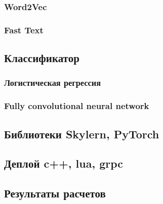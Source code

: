 \documentclass[12pt]{article}
\begin{document}
\subsubsection*{Word2Vec}

\subsubsection*{Fast Text}

\subsection*{Классификатор}

\subsubsection*{Логистическая регрессия}

\subsubsection*{Fully convolutional neural network}

\subsection*{Библиотеки Skylern, PyTorch}

\subsection*{Деплой c++, lua, grpc}

\subsection*{Результаты расчетов}
\end{document}
